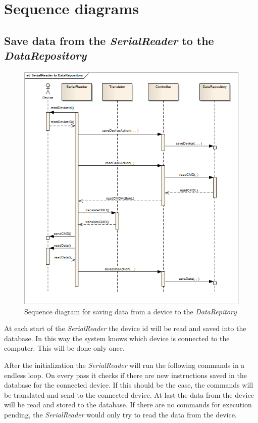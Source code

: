 \newpage
\section{Sequence diagrams}
\subsection{Save data from the \textit{SerialReader} to the \textit{DataRepository}}
\begin{figure}[H]
	\centering
	\includegraphics[width=1.0\textwidth]{pic/SerialReader-to-DataRepository.png}%
    \caption{Sequence diagram for saving data from a device to the \textit{DataRepitory}}
    \label{SerialReadertoDataRepositorypic}%
\end{figure}

At each start of the \textit{SerialReader} the device id will be read and saved into the database. In this way the system knows which device is connected to the computer. This will be done only once.

After the initialization the \textit{SerialReader} will run the following commands in a endless loop. On every pass it checks if there are new instructions saved in the database for the connected device. If this should be the case, the commands will be translated and send to the connected device. At last the data from the device will be read and stored to the database. If there are no commands for execution pending, the \textit{SerialReader} would only try to read the data from the device.

